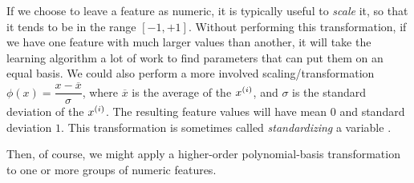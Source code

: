 If we choose to leave a feature as numeric, it is typically useful to
  {\em scale} it, so that it tends to be in the range $[-1, +1]$.
Without performing this transformation, if we have one feature with
much larger values than another, it will take the learning algorithm a
lot of work to find parameters that can put them on an equal basis.
We could also perform a more involved scaling/transformation
$\phi(x) = \dfrac{x - \overline{x}}{\sigma}$, where $\overline{x}$
is the average of the $x^{(i)}$, and $\sigma$ is the standard deviation of
the $x^{(i)}$.  The resulting feature values will have mean $0$ and
standard deviation $1$.   This transformation is sometimes called {\em
    standardizing} a variable .

Then, of course, we might apply a higher-order polynomial-basis
transformation to one or more groups of numeric features.




